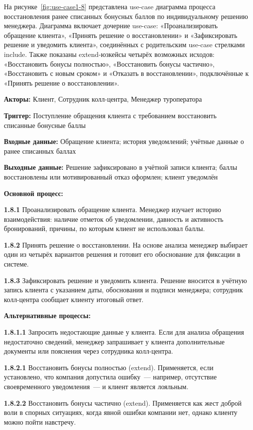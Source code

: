 \documentclass[11pt,a4paper,final]{article}
\begin{document}
На рисунке~\ref{fig:use-case1-8} представлена use-case диаграмма процесса восстановления ранее списанных бонусных баллов по индивидуальному решению менеджера. Диаграмма включает дочерние use-case: «Проанализировать обращение клиента», «Принять решение о восстановлении» и «Зафиксировать решение и уведомить клиента», соединённых с родительским use-case стрелками include. Также показаны extend-юзкейсы четырёх возможных исходов: «Восстановить бонусы полностью», «Восстановить бонусы частично», «Восстановить с новым сроком» и «Отказать в восстановлении», подключённые к «Принять решение о восстановлении».

\textbf{Акторы:} Клиент, Сотрудник колл-центра, Менеджер туроператора

\textbf{Триггер:} Поступление обращения клиента с требованием восстановить списанные бонусные баллы

\textbf{Входные данные:} Обращение клиента; история уведомлений; учётные данные о ранее списанных баллах

\textbf{Выходные данные:} Решение зафиксировано в учётной записи клиента; баллы восстановлены или мотивированный отказ оформлен; клиент уведомлён

\textbf{Основной процесс:}

\textbf{1.8.1} Проанализировать обращение клиента. Менеджер изучает историю взаимодействия: наличие отметок об уведомлении, давность и активность бронирований, причины, по которым клиент не использовал баллы.

\textbf{1.8.2} Принять решение о восстановлении. На основе анализа менеджер выбирает один из четырёх вариантов решения и готовит его обоснование для фиксации в системе.

\textbf{1.8.3} Зафиксировать решение и уведомить клиента. Решение вносится в учётную запись клиента с указанием даты, обоснования и подписи менеджера; сотрудник колл-центра сообщает клиенту итоговый ответ.

\textbf{Альтернативные процессы:}

\textbf{1.8.1.1} Запросить недостающие данные у клиента. Если для анализа обращения недостаточно сведений, менеджер запрашивает у клиента дополнительные документы или пояснения через сотрудника колл-центра.

\textbf{1.8.2.1} Восстановить бонусы полностью (extend). Применяется, если установлено, что компания допустила ошибку~--- например, отсутствие своевременного уведомления~--- и клиент является лояльным.

\textbf{1.8.2.2} Восстановить бонусы частично (extend). Применяется как жест доброй воли в спорных ситуациях, когда явной ошибки компании нет, однако клиенту можно пойти навстречу.
\end{document}
